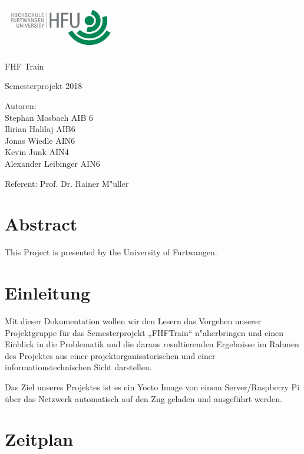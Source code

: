 \documentclass [a4paper,10pt] {article}
\begin{document}
\begin{titlepage}
	\raggedleft
	\includegraphics[width=5cm]{HFULogo}\par\vspace{1cm}

	\centering
	\vfill

	\LARGE FHF Train \par
	\vspace{1cm}
	
	\Large Semesterprojekt 2018 \\
	\vfill
	
	\Large Autoren: \\ 
	Stephan Mosbach AIB 6 \\
 	Ilirian Halilaj AIB6 \\ 
	Jonas Wiedle AIN6 \\ 
	Kevin Junk AIN4 \\
	Alexander Leibinger AIN6\par
	
	\vfill
	Referent: Prof. Dr. Rainer M"uller\par

	\vfill
\end{titlepage}

	\section*{Abstract}

	\vspace{5mm}

	This Project is presented by the University of Furtwangen.

\newpage

\tableofcontents

\newpage
	\section{Einleitung}
	
		Mit dieser Dokumentation wollen wir den Lesern das Vorgehen unserer Projektgruppe für das Semesterprojekt „FHFTrain“ n"aherbringen und einen Einblick in die 			
		Problematik und die daraus resultierenden Ergebnisse im Rahmen des Projektes aus einer projektorganisatorischen und einer informationstechnischen Sicht darstellen. \par
		Das Ziel unseres Projektes ist es ein Yocto Image von einem Server/Raspberry Pi über das Netzwerk automatisch auf den Zug geladen und ausgeführt werden.
	
\newpage
	
\newpage
	\section{Zeitplan}
		\vfill
\newpage
	
\newpage
	
\newpage
		


\newpage
	
\end{document}
